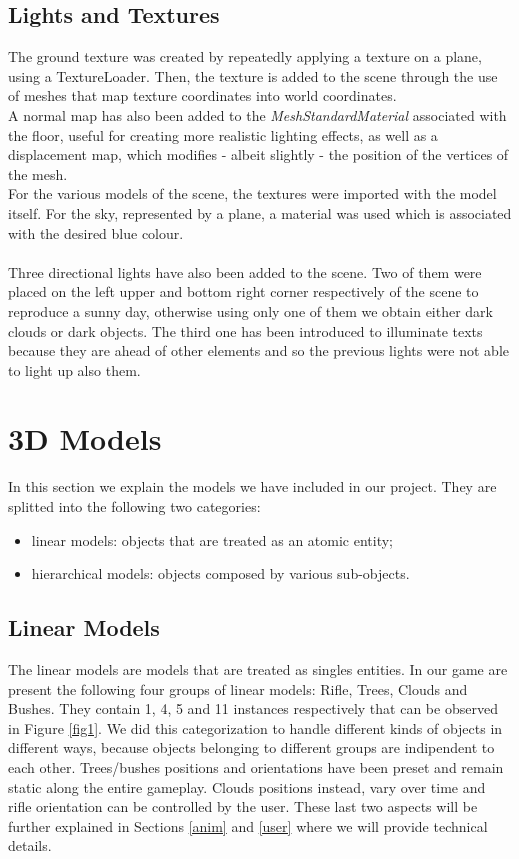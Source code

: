 \documentclass[12pt,a4paper]{article}
\begin{document}
	\subsection{Lights and Textures}
	The ground texture was created by repeatedly applying a texture on 
	a plane, using a TextureLoader. Then, the texture is added to the
	scene through the use of meshes that map texture coordinates into
	world coordinates.\\
	A normal map has also been added to the \textit{MeshStandardMaterial} associated with the floor, useful for creating more realistic lighting effects, as well as a displacement map, which modifies - albeit slightly - the position of the vertices of the mesh.\\
	For the various models of the scene, the textures were imported with the model itself. For the sky, represented by a plane, a material was used which is associated with the desired blue colour.\\\\
	Three directional lights have also been added to the scene. 
	Two of them were placed on the left upper and bottom right corner 
	respectively of the scene to reproduce a sunny day, otherwise using
	only one of them we obtain either dark clouds or dark objects. 
	The third one has been introduced to illuminate texts because they 
	are ahead of other elements and so the previous lights were
	not able to light up also them.
	\section{3D Models}
	In this section we explain the models we have included in our project. They are splitted into
	the following two categories: 
	\begin{itemize}
		\item linear models: objects that are treated as an atomic entity;
		\item hierarchical models: objects composed by various sub-objects. 
	\end{itemize}
	\subsection{Linear Models} \label{linear}
	The linear models are models that are treated as singles entities. In our game are present the following four groups of linear models: Rifle, Trees, Clouds and Bushes. They contain 1, 4, 5 and 11 instances respectively that can be observed in Figure \ref{fig1}. We did this categorization to handle different kinds of objects in different ways, because objects belonging to different groups are indipendent to each other. Trees/bushes positions and orientations have been preset and remain static along the entire gameplay. Clouds positions instead, vary over time and rifle orientation can be controlled by the user. These last two aspects will be further explained in Sections \ref{anim} and \ref{user} where we will provide technical details.
\end{document}

